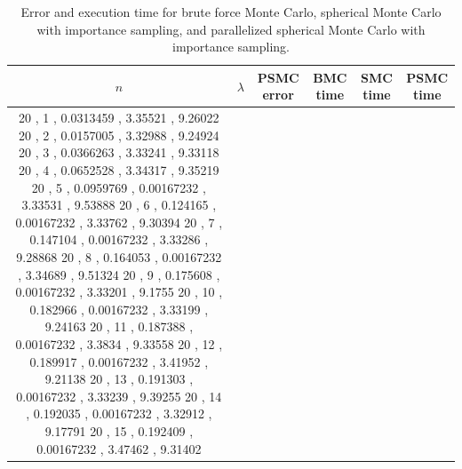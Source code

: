 \documentclass{article}
\begin{document}
\begin{table}[ht] \label{tab:error-MonteCarlo}
    \centering
      \caption{Error and execution time for brute force Monte Carlo, spherical Monte Carlo with importance sampling, and parallelized spherical Monte Carlo with importance sampling.}
      \vspace{2mm}
      \begin{tabular}{|c|c|c|c|c|c|}
        \hline
        $n$ & $\lambda$ & PSMC error & BMC time & SMC time & PSMC time  \\
        \hline \hline
            20 , 1 , 0.0313459 , 3.35521 , 9.26022
            20 , 2 , 0.0157005 , 3.32988 , 9.24924
            20 , 3 , 0.0366263 , 3.33241 , 9.33118
            20 , 4 , 0.0652528 , 3.34317 , 9.35219
            20 , 5 , 0.0959769 , 0.00167232 , 3.33531 , 9.53888
            20 , 6 , 0.124165 , 0.00167232 , 3.33762 , 9.30394
            20 , 7 , 0.147104 , 0.00167232 , 3.33286 , 9.28868
            20 , 8 , 0.164053 , 0.00167232 , 3.34689 , 9.51324
            20 , 9 , 0.175608 , 0.00167232 , 3.33201 , 9.1755
            20 , 10 , 0.182966 , 0.00167232 , 3.33199 , 9.24163
            20 , 11 , 0.187388 , 0.00167232 , 3.3834 , 9.33558
            20 , 12 , 0.189917 , 0.00167232 , 3.41952 , 9.21138
            20 , 13 , 0.191303 , 0.00167232 , 3.33239 , 9.39255
            20 , 14 , 0.192035 , 0.00167232 , 3.32912 , 9.17791
            20 , 15 , 0.192409 , 0.00167232 , 3.47462 , 9.31402
        \hline
      \end{tabular} \\
      \hspace{0pt}\\
  \end{table}
\end{document}
